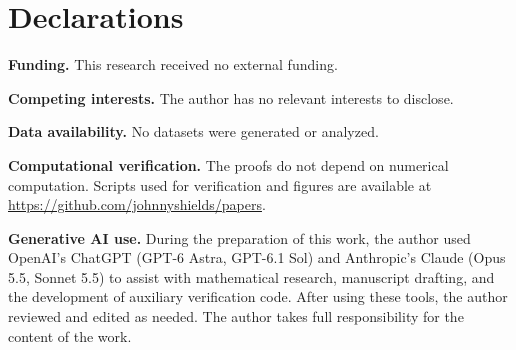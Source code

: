 \documentclass[11pt,a4paper]{amsart}
\numberwithin{equation}{section}
\theoremstyle{plain}
\theoremstyle{definition}
\begin{document}
\section*{Declarations}
{\footnotesize
\noindent\textbf{Funding.} This research received no external funding.

\smallskip
\noindent\textbf{Competing interests.} The author has no relevant interests to disclose.

\smallskip
\noindent\textbf{Data availability.} No datasets were generated or analyzed.

\smallskip
\noindent\textbf{Computational verification.} The proofs do not depend on numerical computation.  Scripts used for verification and figures are available at \url{https://github.com/johnnyshields/papers}.

\smallskip
\noindent\textbf{Generative AI use.} During the preparation of this work, the author used OpenAI's ChatGPT (GPT-6 Astra, GPT-6.1 Sol) and Anthropic's Claude (Opus 5.5, Sonnet 5.5) to assist with mathematical research, manuscript drafting, and the development of auxiliary verification code.  After using these tools, the author reviewed and edited as needed.  The author takes full responsibility for the content of the work.
\par}
\end{document}
